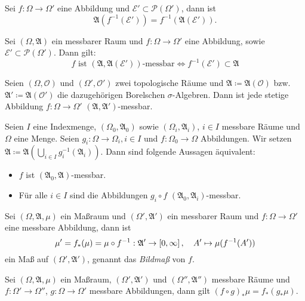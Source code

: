 \documentclass{cheat-sheet}
\newcommand{\Alg}{\mathfrak{A}} %
\theoremstyle{definition}
\begin{document}
\begin{satz}
  Sei $f : \Omega \to \Omega'$ eine Abbildung und $\mathcal{E}' \subset \mathcal{P}(\Omega')$, dann ist
  \[ \Alg(f^{-1}(\mathcal{E}')) = f^{-1}(\Alg(\mathcal{E}')). \]
\end{satz}

\begin{satz}
  Sei $(\Omega, \Alg)$ ein messbarer Raum und $f : \Omega \to \Omega'$ eine Abbildung, sowie $\mathcal{E'} \subset \mathcal{P}(\Omega')$. Dann gilt:
  \[ f \text{ ist } (\Alg, \Alg(\mathcal{E}')) \text{-messbar} \iff f^{-1}(\mathcal{E}') \subset \Alg \]
\end{satz}

\begin{satz}
  Seien $(\Omega, \mathcal{O})$ und $(\Omega', \mathcal{O}')$ zwei topologische Räume und $\Alg \coloneqq \Alg(\mathcal{O})$ bzw. $\Alg' \coloneqq \Alg(\mathcal{O}')$ die dazugehörigen Borelschen $\sigma$-Algebren. Dann ist jede stetige Abbildung $f : \Omega \to \Omega'$ $(\Alg, \Alg')$-messbar.
\end{satz}


\begin{satz}[Projektionssatz]
  Seien $I$ eine Indexmenge, $(\Omega_0, \Alg_0)$ sowie $(\Omega_i, \Alg_i)$, $i \in I$ messbare Räume und $\Omega$ eine Menge. Seien $g_i : \Omega \to \Omega_i, i \in I$ und $f : \Omega_0 \to \Omega$ Abbildungen. Wir setzen $\Alg \coloneqq \Alg\left( \bigcup_{i \in I} g_i^{-1}(\Alg_i) \right)$. Dann sind folgende Aussagen äquivalent:
  \begin{itemize}
    \item $f$ ist $(\Alg_0, \Alg)$-messbar.
    \item Für alle $i \in I$ sind die Abbildungen $g_i \circ f$ $(\Alg_0, \Alg_i)$-messbar.
  \end{itemize}
\end{satz}

\begin{satz}
  Sei $(\Omega, \Alg, \mu)$ ein Maßraum und $(\Omega', \Alg')$ ein messbarer Raum und $f : \Omega \to \Omega'$ eine messbare Abbildung, dann ist
  \[ \mu' = f_*(\mu) = \mu \circ f^{-1} : \Alg' \to \cinterval{0}{\infty}, \quad A' \mapsto \mu(f^{-1}(A')) \]
  ein Maß auf $(\Omega', \Alg')$, genannt das \emph{Bildmaß} von $f$.
\end{satz}

\begin{bem}
  Sei $(\Omega, \Alg, \mu)$ ein Maßraum, $(\Omega', \Alg')$ und $(\Omega'', \Alg'')$ messbare Räume und $f : \Omega' \to \Omega''$, $g : \Omega \to \Omega'$ messbare Abbildungen, dann gilt $(f \circ g)_* \mu = f_*(g_* \mu)$.
\end{bem}
\end{document}
